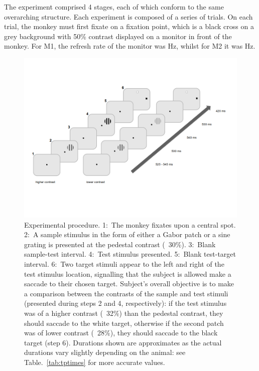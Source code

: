The experiment comprised 4 stages, each of which conform to the same overarching structure.
Each experiment is composed of a series of trials. On each trial, the monkey must first fixate on a fixation point, which is a black cross on a grey background with 50\% contrast displayed on a monitor in front of the monkey. For M1, the refresh rate of the monitor was \unit[85]{Hz}, whilst for M2 it was \unit[75]{Hz}.

\begin{figure}[htbp]
\begin{center}
\includegraphics[width=\linewidth]{./figs/PLtask1.png}
\end{center}
\caption{\small{}
Experimental procedure.
1:~The monkey fixates upon a central spot. 2:~A sample stimulus in the form of either a Gabor patch or a sine grating is presented at the pedestal contrast (\eg{}~30\%). 3:~Blank sample-test interval. 4:~Test stimulus presented. 5:~Blank test-target interval. 6:~Two target stimuli appear to the left and right of the test stimulus location, signalling that the subject is allowed make a saccade to their chosen target.
Subject's overall objective is to make a comparison between the contrasts of the sample and test stimuli (presented during steps 2 and 4, respectively): if the test stimulus was of a higher contrast (\eg{}~32\%) than the pedestal contrast, they should saccade to the white target, otherwise if the second patch was of lower contrast (\eg{}~28\%), they should saccade to the black target (step 6).
Durations shown are approximates as the actual durations vary slightly depending on the animal: see Table.~\ref{tab:tptimes} for more accurate values.}
\label{fig:pltask1}
\end{figure}

